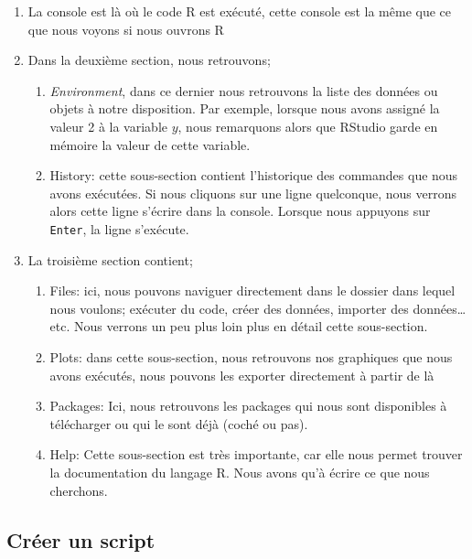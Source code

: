 \documentclass[11pt]{article}
\providecommand{\tightlist}{%
      \setlength{\itemsep}{0pt}\setlength{\parskip}{0pt}}
\begin{document}
    \begin{enumerate}
\def\labelenumi{\arabic{enumi}.}
\tightlist
\item
  La console est là où le code R est exécuté, cette console est la même
  que ce que nous voyons si nous ouvrons R
\item
  Dans la deuxième section, nous retrouvons;

  \begin{enumerate}
  \def\labelenumii{\arabic{enumii}.}
  \tightlist
  \item
    \emph{Environment}, dans ce dernier nous retrouvons la liste des
    données ou objets à notre disposition. Par exemple, lorsque nous
    avons assigné la valeur 2 à la variable \(y\), nous remarquons alors
    que RStudio garde en mémoire la valeur de cette variable.
  \item
    History: cette sous-section contient l'historique des commandes que
    nous avons exécutées. Si nous cliquons sur une ligne quelconque,
    nous verrons alors cette ligne s'écrire dans la console. Lorsque
    nous appuyons sur \texttt{Enter}, la ligne s'exécute.
  \end{enumerate}
\item
  La troisième section contient;

  \begin{enumerate}
  \def\labelenumii{\arabic{enumii}.}
  \tightlist
  \item
    Files: ici, nous pouvons naviguer directement dans le dossier dans
    lequel nous voulons; exécuter du code, créer des données, importer
    des données\ldots{}etc. Nous verrons un peu plus loin plus en détail
    cette sous-section.
  \item
    Plots: dans cette sous-section, nous retrouvons nos graphiques que
    nous avons exécutés, nous pouvons les exporter directement à partir
    de là
  \item
    Packages: Ici, nous retrouvons les packages qui nous sont
    disponibles à télécharger ou qui le sont déjà (coché ou pas).
  \item
    Help: Cette sous-section est très importante, car elle nous permet
    trouver la documentation du langage R. Nous avons qu'à écrire ce que
    nous cherchons.
  \end{enumerate}
\end{enumerate}

    \hypertarget{cruxe9er-un-script}{%
\subsection{Créer un script}\label{cruxe9er-un-script}}
\end{document}
